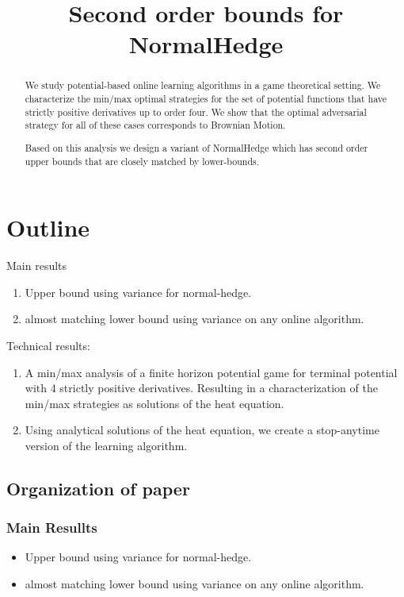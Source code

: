 \documentclass[anon,12pt]{colt2024} %
\title[Second order NormalHedge]{Second order bounds for NormalHedge}
\begin{document}
\maketitle
\begin{abstract}
  We study potential-based online learning algorithms in a game
  theoretical setting. We characterize the min/max optimal strategies
  for the set of potential functions that have strictly positive
  derivatives up to order four. We show that the optimal adversarial
  strategy for all of these cases corresponds to Brownian Motion.

  Based on this analysis we design a variant of NormalHedge which has
  second order upper bounds that are closely matched by lower-bounds.
  
\end{abstract}

\section{Outline}

Main results
\begin{enumerate}
\item Upper bound using variance for normal-hedge.
\item almost matching lower bound using variance on any online algorithm.
\end{enumerate}

Technical results:
\begin{enumerate}
\item A min/max analysis of a finite horizon potential game for
  terminal potential with 4 strictly positive derivatives.  Resulting
  in a characterization of the min/max strategies as solutions of the
  heat equation.
\item Using analytical solutions of the heat equation, we create a
  stop-anytime version of the learning algorithm.
\end{enumerate}

\subsection{Organization of paper}
\subsubsection{Main Resullts}
\begin{itemize}
\item Upper bound using variance for normal-hedge.
\item almost matching lower bound using variance on any online algorithm.
\end{itemize}
\end{document}
